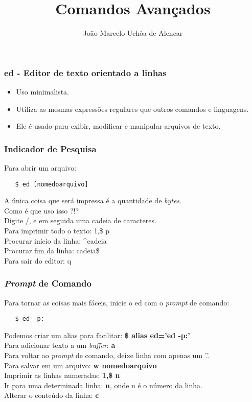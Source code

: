 \documentclass{beamer}
\title{Comandos Avançados}
\author[João Marcelo Uchôa de Alencar]{João Marcelo Uchôa de Alencar}
\institute{Universidade Federal do Ceará - Quixadá}
\begin{document}
   \begin{frame}
      \titlepage
   \end{frame}

   \begin{frame}
      \frametitle{ed - Editor de texto orientado a linhas}
      \begin{itemize}
         \item Uso minimalista. 
         \item Utiliza as mesmas expressões regulares que outros comandos e linguagens.
	 \item Ele é usado para exibir, modificar e manipular arquivos de texto. 
      \end{itemize}
   \end{frame}

\begin{frame}[fragile]
   \frametitle{Indicador de Pesquisa}
   Para abrir um arquivo: 
   \begin{verbatim}
   $ ed [nomedoarquivo] 
   \end{verbatim}
   A única coisa que será impressa é a quantidade de \textit{bytes}. \\
   Como é que uso isso ?!? \\
   Digite \slash, e em seguida uma cadeia de caracteres. \\
   Para imprimir todo o texto: 1,\$ p \\
   Procurar início da linha: \^{}cadeia \\
   Procurar fim da linha: cadeia\$ \\
   Para sair do editor: q \\
\end{frame}

\begin{frame}[fragile]
   \frametitle{\textit{Prompt} de Comando}
   Para tornar as coisas mais fáceis, inicie o ed com o \textit{prompt} de comando: 
   \begin{verbatim}
   $ ed -p:
   \end{verbatim}
   Podemos criar um alias para facilitar: \textbf{\$ alias ed='ed -p:'} \\
   Para adicionar texto a um \textit{buffer}: \textbf{a} \\
   Para voltar ao \textit{prompt} de comando, deixe linha com apenas um '.'. \\
   Para salvar em um arquivo: \textbf{w nomedoarquivo} \\
   Imprimir as linhas numeradas: \textbf{1,\$ n} \\
   Ir para uma determinada linha: \textbf{n}, onde n é o número da linha. \\
   Alterar o conteúdo da linha: \textbf{c} \\
\end{frame}
\end{document}
